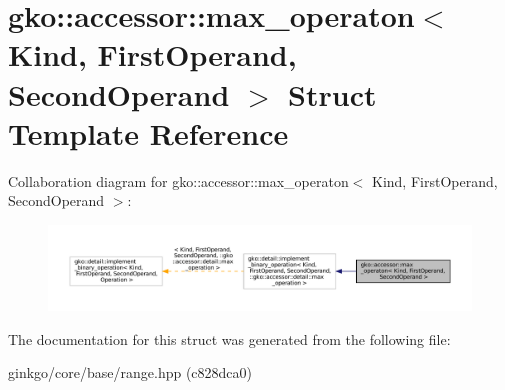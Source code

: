 \hypertarget{structgko_1_1accessor_1_1max__operaton}{}\section{gko\+:\+:accessor\+:\+:max\+\_\+operaton$<$ Kind, First\+Operand, Second\+Operand $>$ Struct Template Reference}
\label{structgko_1_1accessor_1_1max__operaton}


Collaboration diagram for gko\+:\+:accessor\+:\+:max\+\_\+operaton$<$ Kind, First\+Operand, Second\+Operand $>$\+:
\nopagebreak
\begin{figure}[H]
\begin{center}
\leavevmode
\includegraphics[width=350pt]{structgko_1_1accessor_1_1max__operaton__coll__graph}
\end{center}
\end{figure}


The documentation for this struct was generated from the following file\+:\begin{DoxyCompactItemize}
\item 
ginkgo/core/base/range.\+hpp (c828dca0)\end{DoxyCompactItemize}
